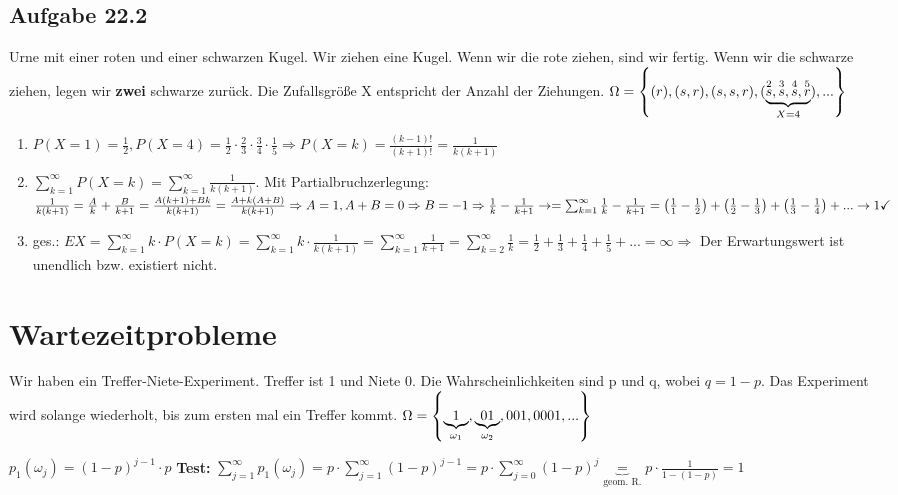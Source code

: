 \renewcommand{\ldate}{2015-12-22}

\subsection{Aufgabe 22.2}
Urne mit einer roten und einer schwarzen Kugel. Wir ziehen eine Kugel. Wenn wir die rote ziehen, sind wir fertig. Wenn wir die schwarze ziehen, legen wir \textbf{zwei} schwarze zurück. 
Die Zufallsgröße X entspricht der Anzahl der Ziehungen. 
$\Omega =  \left\lbrace (r), (s,r), (s,s,r), (\underbrace{\overset{2}{s},\overset{3}{s},\overset{4}{s},\overset{5}{r}}_{X=4}), ... \right\rbrace $

\begin{enumerate}
\item $P(X=1) = \frac{1}{2}, P(X=4) = \frac{1}{2} \cdot \frac{2}{3} \cdot \frac{3}{4} \cdot \frac{1}{5}
\Rightarrow P(X=k) = \frac{(k-1)!}{(k+1)!} = \frac{1}{k(k+1)}$
\item $ \sum_{k=1}^{\infty} P(X=k) = \sum_{k=1}^{\infty} \frac{1}{k(k+1)}$. Mit Partialbruchzerlegung: 
$ 
\frac{1}{k(k+1)}
= \frac{A}{k} + \frac{B}{k+1}
= \frac{A(k+1) + Bk}{k(k+1)}
= \frac{A + k(A+B)}{k(k+1)}
\Rightarrow A = 1, A + B = 0 \Rightarrow B = -1
\Rightarrow \frac{1}{k} - \frac{1}{k+1}
\rightarrow = \sum_{k=1}^{\infty} \frac{1}{k} - \frac{1}{k+1}
=  \left( \frac{1}{1} - \frac{1}{2} \right)  +  \left( \frac{1}{2} - \frac{1}{3} \right)  +   \left( \frac{1}{3} - \frac{1}{4} \right)  + ... \rightarrow 1 \checkmark
$
\item ges.: 
$ 
EX = \sum_{k=1}^{\infty} k \cdot P(X=k) 
= \sum_{k=1}^{\infty} k \cdot \frac{1}{k(k+1)}
= \sum_{k=1}^{\infty} \frac{1}{k+1}
= \sum_{k=2}^{\infty} \frac{1}{k}
= \frac{1}{2} + \frac{1}{3} + \frac{1}{4} + \frac{1}{5} + ...
= \infty
\Rightarrow $ Der Erwartungswert ist unendlich bzw. existiert nicht. 
\end{enumerate}

\section{Wartezeitprobleme}
Wir haben ein Treffer-Niete-Experiment. Treffer ist 1 und Niete 0. Die Wahrscheinlichkeiten sind p und q, wobei $q=1-p$. Das Experiment wird solange wiederholt, bis zum ersten mal ein Treffer kommt. 
$\Omega =  \left\lbrace \underbrace{1}_{\omega_1}, \underbrace{01}_{\omega_2}, 001, 0001, ... \right\rbrace $

$p_1(\omega_j) = (1-p)^{j-1} \cdot p$
\textbf{Test:} $ \sum_{j=1}^{\infty} p_1 (\omega_j) 
= p\cdot \sum_{j=1}^{\infty} (1-p)^{j-1}
= p\cdot \sum_{j=0}^{\infty} (1-p)^{j}
\underbrace{=}_{\textrm{geom. R.}} p\cdot \frac{1}{1-(1-p)} = 1
$

